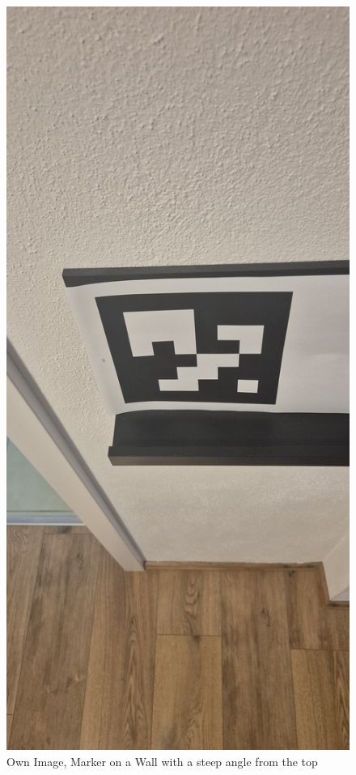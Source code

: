 \documentclass[a4paper,twocolumn]{article}
\begin{document}
\begin{figure}[htbp]
    \centering
    \includegraphics[width=\columnwidth, keepaspectratio]{newImg/20241129_153147.jpeg}
    \caption{Own Image, Marker on a Wall with a steep angle from the top\cite{tim-schweitzer}}
    \label{fig:example-pappendix3}
\end{figure}
\end{document}
